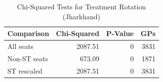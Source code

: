\begin{table}[!h]
\centering
\caption{\label{tab:chi_sq_uk}Chi-Squared Tests for Treatment Rotation (Jharkhand)}
\centering
\fontsize{8}{10}\selectfont
\begin{tabular}[t]{lrrr}
\toprule
Comparison & Chi-Squared & P-Value & GPs\\
\midrule
All seats & 2087.51 & 0 & 3831\\
Non-ST seats & 673.09 & 0 & 1871\\
ST rescaled & 2087.51 & 0 & 3831\\
\bottomrule
\end{tabular}
\end{table}

